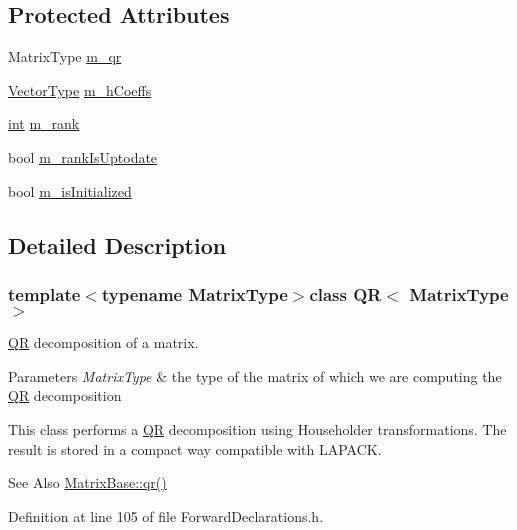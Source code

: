 \subsection*{Protected Attributes}
\begin{DoxyCompactItemize}
\item 
Matrix\-Type \hyperlink{class_q_r_a1f658834aa974fed1da1013419bacf33}{m\-\_\-qr}
\item 
\hyperlink{class_q_r_aa143adafe838b6aa495e342c52a21f0e}{Vector\-Type} \hyperlink{class_q_r_a30cc8665a2b668c899eb94a37b464682}{m\-\_\-h\-Coeffs}
\item 
\hyperlink{ioapi_8h_a787fa3cf048117ba7123753c1e74fcd6}{int} \hyperlink{class_q_r_a1d766c7db1a2d88a21792d137a9a54b6}{m\-\_\-rank}
\item 
bool \hyperlink{class_q_r_a18cd3edcb85f36b4f3abad192d90de9f}{m\-\_\-rank\-Is\-Uptodate}
\item 
bool \hyperlink{class_q_r_a568228d6ec9df26483477813513de7e2}{m\-\_\-is\-Initialized}
\end{DoxyCompactItemize}


\subsection{Detailed Description}
\subsubsection*{template$<$typename Matrix\-Type$>$class Q\-R$<$ Matrix\-Type $>$}

\hyperlink{class_q_r}{Q\-R} decomposition of a matrix. 


\begin{DoxyParams}{Parameters}
{\em Matrix\-Type} & the type of the matrix of which we are computing the \hyperlink{class_q_r}{Q\-R} decomposition\\
\hline
\end{DoxyParams}
This class performs a \hyperlink{class_q_r}{Q\-R} decomposition using Householder transformations. The result is stored in a compact way compatible with L\-A\-P\-A\-C\-K.

\begin{DoxySeeAlso}{See Also}
\hyperlink{class_matrix_base_af9393824bddc6f0782a846037719de48}{Matrix\-Base\-::qr()} 
\end{DoxySeeAlso}


Definition at line 105 of file Forward\-Declarations.\-h.



